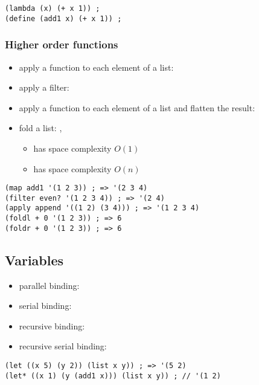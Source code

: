 \documentclass[a4paper,landscape,10pt]{article}
\begin{document}
\begin{multicols*}{2}
  \begin{lstlisting}[language=Racket]
(lambda (x) (+ x 1)) ;
(define (add1 x) (+ x 1)) ;
\end{lstlisting}

  \subsubsection{Higher order functions}

  \begin{itemize}
    \item apply a function to each element of a list: 
    \item apply a filter: 
    \item apply a function to each element of a list and flatten the result: 
    \item fold a list: , 
          \begin{itemize}
            \item {} has space complexity \(O(1)\)
            \item {} has space complexity \(O(n)\)
          \end{itemize}
  \end{itemize}

  \begin{lstlisting}[language=Racket]
(map add1 '(1 2 3)) ; => '(2 3 4)
(filter even? '(1 2 3 4)) ; => '(2 4)
(apply append '((1 2) (3 4))) ; => '(1 2 3 4)
(foldl + 0 '(1 2 3)) ; => 6
(foldr + 0 '(1 2 3)) ; => 6
\end{lstlisting}


  \subsection{Variables}

  \begin{itemize}
    \item parallel binding: 
    \item serial binding: 
    \item recursive binding: 
    \item recursive serial binding: 
  \end{itemize}

  \begin{lstlisting}[language=Racket]
(let ((x 5) (y 2)) (list x y)) ; => '(5 2)
(let* ((x 1) (y (add1 x))) (list x y)) ; // '(1 2)
\end{lstlisting}


\end{multicols*}
\end{document}
